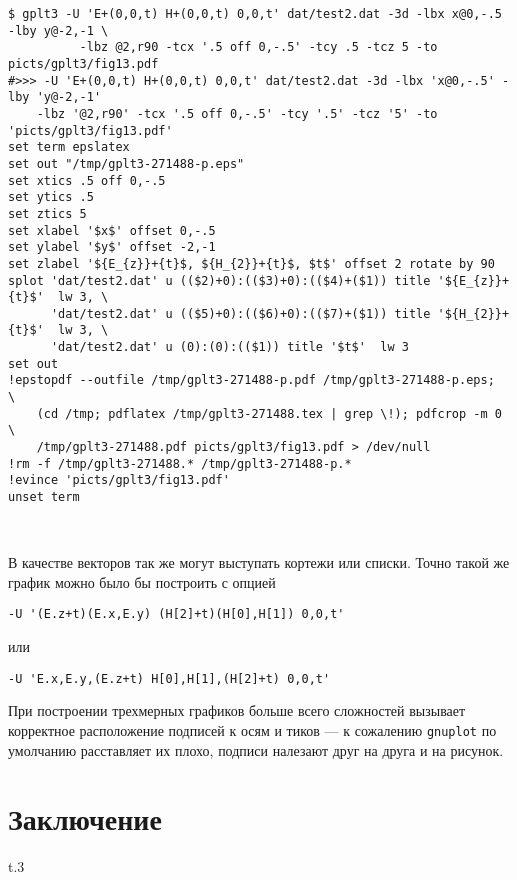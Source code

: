 \documentclass[12pt]{article}
\def\gnuplot{{\tt gnuplot}}
\begin{document}
\vspace{3mm}
\noindent
{\small
\begin{verbatim}
$ gplt3 -U 'E+(0,0,t) H+(0,0,t) 0,0,t' dat/test2.dat -3d -lbx x@0,-.5 -lby y@-2,-1 \
          -lbz @2,r90 -tcx '.5 off 0,-.5' -tcy .5 -tcz 5 -to picts/gplt3/fig13.pdf
#>>> -U 'E+(0,0,t) H+(0,0,t) 0,0,t' dat/test2.dat -3d -lbx 'x@0,-.5' -lby 'y@-2,-1' 
    -lbz '@2,r90' -tcx '.5 off 0,-.5' -tcy '.5' -tcz '5' -to 'picts/gplt3/fig13.pdf'
set term epslatex 
set out "/tmp/gplt3-271488-p.eps"
set xtics .5 off 0,-.5
set ytics .5
set ztics 5
set xlabel '$x$' offset 0,-.5
set ylabel '$y$' offset -2,-1
set zlabel '${E_{z}}+{t}$, ${H_{2}}+{t}$, $t$' offset 2 rotate by 90
splot 'dat/test2.dat' u (($2)+0):(($3)+0):(($4)+($1)) title '${E_{z}}+{t}$'  lw 3, \
      'dat/test2.dat' u (($5)+0):(($6)+0):(($7)+($1)) title '${H_{2}}+{t}$'  lw 3, \
      'dat/test2.dat' u (0):(0):(($1)) title '$t$'  lw 3 
set out
!epstopdf --outfile /tmp/gplt3-271488-p.pdf /tmp/gplt3-271488-p.eps;               \
    (cd /tmp; pdflatex /tmp/gplt3-271488.tex | grep \!); pdfcrop -m 0              \
    /tmp/gplt3-271488.pdf picts/gplt3/fig13.pdf > /dev/null
!rm -f /tmp/gplt3-271488.* /tmp/gplt3-271488-p.*
!evince 'picts/gplt3/fig13.pdf'
unset term
\end{verbatim}
  }
\vspace{-1cm}
\begin{center}
\\[3mm]
\end{center}
В качестве векторов так же могут выступать кортежи или списки. Точно такой же график можно было бы построить с опцией
\begin{verbatim}
-U '(E.z+t)(E.x,E.y) (H[2]+t)(H[0],H[1]) 0,0,t'
\end{verbatim}
или
\begin{verbatim}
-U 'E.x,E.y,(E.z+t) H[0],H[1],(H[2]+t) 0,0,t'
\end{verbatim}
При построении трехмерных графиков больше всего сложностей
вызывает корректное расположение подписей к осям и тиков --- к сожалению \gnuplot{} по умолчанию расставляет их плохо, подписи
налезают друг на друга и на рисунок.

\newpage
\section{Заключение}
\begin{wrapfigure}[7]{t}{.3\textwidth}
  \vphantom{.}

  \vspace{-2.3cm}
\end{wrapfigure}
\end{document}
